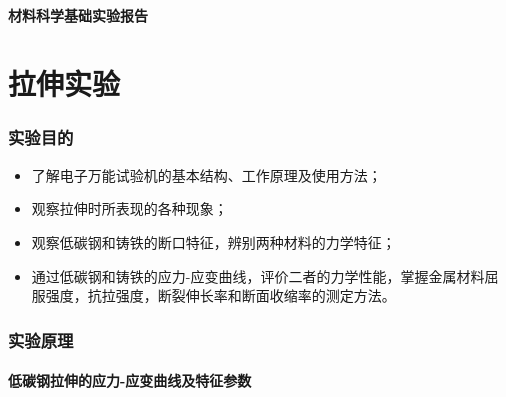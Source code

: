 \documentclass[a4paper,utf8]{article}
\begin{document}
\begin{center}
    {\mbox{}\\[7em]\bfseries\songti%
    材料科学基础实验报告}\\[34mm]
\end{center}
\newpage
\part{拉伸实验}
\section{实验目的}
\begin{itemize}
    \item 了解电子万能试验机的基本结构、工作原理及使用方法；
    \item 观察拉伸时所表现的各种现象；
    \item 观察低碳钢和铸铁的断口特征，辨别两种材料的力学特征；
    \item 通过低碳钢和铸铁的应力-应变曲线，评价二者的力学性能，掌握金属材料屈服强度，抗拉强度，断裂伸长率和断面收缩率的测定方法。
\end{itemize}
\section{实验原理}%
\subsection{低碳钢拉伸的应力-应变曲线及特征参数}
\end{document}
